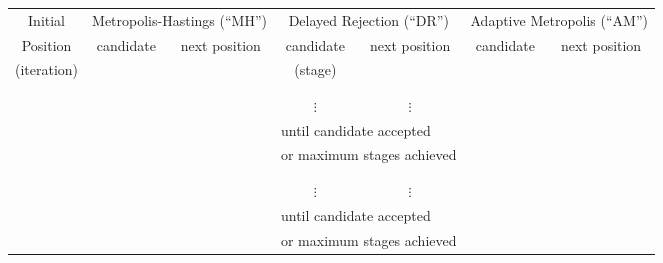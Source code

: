 \begin{sidewaystable}
\begin{tabular}{|c||c|c||c|c||c|c|}
\hline
 Initial    & \multicolumn{2}{c||}{Metropolis-Hastings (``MH'')} & \multicolumn{2}{c||}{Delayed Rejection (``DR'')} & \multicolumn{2}{c|}{Adaptive Metropolis (``AM'')} \\
\cline{2-7}
 Position   & candidate     & next position             & candidate     & next position           & candidate     & next position            \\
(iteration) &               &                           & (stage)       &                         &               &                          \\
\hline
\hline
            &               &                           &               &                         &               &                          \\
\cline{4-5}
            &               &                           &               &                         &               &                          \\
\cline{4-5}
            &               &                           & $\vdots$      & $\vdots$                &               &                          \\
\cline{4-5}
            &               &                  & \multicolumn{2}{l||}{until candidate accepted}   &               &                          \\
            &               &                  & \multicolumn{2}{l||}{or maximum stages achieved} &               &                          \\
\hline
\hline
            &               &                           &               &                         &               &                          \\
\cline{4-5}
            &               &                           &               &                         &               &                          \\
\cline{4-5}
            &               &                           & $\vdots$      & $\vdots$                &               &                          \\
\cline{4-5}
            &               &                  & \multicolumn{2}{l||}{until candidate accepted}   &               &                          \\
            &               &                  & \multicolumn{2}{l||}{or maximum stages achieved} &               &                          \\

\end{tabular}
\end{sidewaystable}
